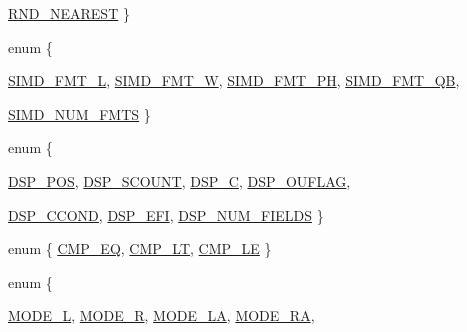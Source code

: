 \begin{DoxyCompactItemize}
\hyperlink{namespaceMipsISA_aa1e4b1e2e1e9c0f9c77041f40799a170aaab1d0a67b8b7f129c7bf4d3165a9fe2}{RND\_\-NEAREST}
 \}
\item 
enum \{ \par
\hyperlink{namespaceMipsISA_abc5c98fcc1211af2b80116dd6e0a035dabc5db6a7905a06b9ef7dac8f5a1ceb57}{SIMD\_\-FMT\_\-L}, 
\hyperlink{namespaceMipsISA_abc5c98fcc1211af2b80116dd6e0a035daaf3817deece40f38ee136ea035cdfa65}{SIMD\_\-FMT\_\-W}, 
\hyperlink{namespaceMipsISA_abc5c98fcc1211af2b80116dd6e0a035da121fe6c797f84b036a02c50d5a1086f4}{SIMD\_\-FMT\_\-PH}, 
\hyperlink{namespaceMipsISA_abc5c98fcc1211af2b80116dd6e0a035daa9e20efc4e0454d109d83b13e1ff24d9}{SIMD\_\-FMT\_\-QB}, 
\par
\hyperlink{namespaceMipsISA_abc5c98fcc1211af2b80116dd6e0a035da7711d6a94d621f0465c95e9c4072a313}{SIMD\_\-NUM\_\-FMTS}
 \}
\item 
enum \{ \par
\hyperlink{namespaceMipsISA_ac36f475ca5b446f4fde4c9b90bec77c8abec11a30f24069b14b2c57fa4ffa2cb9}{DSP\_\-POS}, 
\hyperlink{namespaceMipsISA_ac36f475ca5b446f4fde4c9b90bec77c8a1e91ee45e01183742aa2f76ac84fa71a}{DSP\_\-SCOUNT}, 
\hyperlink{namespaceMipsISA_ac36f475ca5b446f4fde4c9b90bec77c8a76bc39ce25670a19f38f9b530294fd7c}{DSP\_\-C}, 
\hyperlink{namespaceMipsISA_ac36f475ca5b446f4fde4c9b90bec77c8a7d3666cfe4f21743fbc091810f026f26}{DSP\_\-OUFLAG}, 
\par
\hyperlink{namespaceMipsISA_ac36f475ca5b446f4fde4c9b90bec77c8aea7e469026daf92b20c31db8b3190ace}{DSP\_\-CCOND}, 
\hyperlink{namespaceMipsISA_ac36f475ca5b446f4fde4c9b90bec77c8a20b2e164386631bdf0b2c688e3e3018d}{DSP\_\-EFI}, 
\hyperlink{namespaceMipsISA_ac36f475ca5b446f4fde4c9b90bec77c8ad961a62d560bdaeb4884bdf08c010f24}{DSP\_\-NUM\_\-FIELDS}
 \}
\item 
enum \{ \hyperlink{namespaceMipsISA_a05589fbab0657f08285ebdfe93f5ec9ea426856996bbe8179c8f3dffe724b49c5}{CMP\_\-EQ}, 
\hyperlink{namespaceMipsISA_a05589fbab0657f08285ebdfe93f5ec9eaa19631d0d9130794781397d706758e05}{CMP\_\-LT}, 
\hyperlink{namespaceMipsISA_a05589fbab0657f08285ebdfe93f5ec9ea94ce84b6ac0066e66f24eee6a5022f73}{CMP\_\-LE}
 \}
\item 
enum \{ \par
\hyperlink{namespaceMipsISA_a16af7b253440dadd46a80a4b9fddba4da93f01ca83f3b5e3dc942213a4777857c}{MODE\_\-L}, 
\hyperlink{namespaceMipsISA_a16af7b253440dadd46a80a4b9fddba4da1e03ce070d35567c677bbb57d8c8a64e}{MODE\_\-R}, 
\hyperlink{namespaceMipsISA_a16af7b253440dadd46a80a4b9fddba4da4d5086e26428bf5e596c0b3e4f958864}{MODE\_\-LA}, 
\hyperlink{namespaceMipsISA_a16af7b253440dadd46a80a4b9fddba4da0f1a8b9779ed0c560a34f70718886e6b}{MODE\_\-RA}, 

\end{DoxyCompactItemize}
